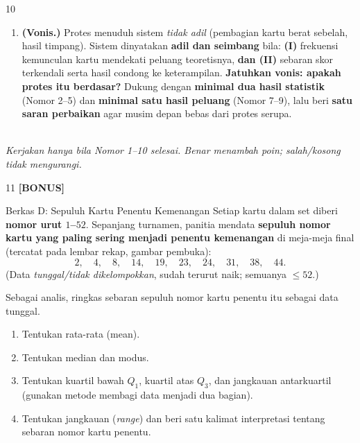 \documentclass[11pt]{article}
\newenvironment{subsoal}{%
  \begin{enumerate}[label=\textbf{(\alph*)},leftmargin=1.8em,itemsep=5pt,topsep=3pt]}%
  {\end{enumerate}}
\begin{document}
\begin{soal}{10}
\begin{subsoal}
        dikeluarkan, apakah korelasi waktu--skor \emph{menguat} atau \emph{melemah}?
        Mengapa?
  \item \textbf{(Vonis.)} Protes menuduh sistem \emph{tidak adil} (pembagian kartu
        berat sebelah, hasil timpang). Sistem dinyatakan \textbf{adil dan seimbang}
        bila: \textbf{(I)} frekuensi kemunculan kartu mendekati peluang teoretisnya,
        \textbf{dan (II)} sebaran skor terkendali serta hasil condong ke keterampilan.
        \textbf{Jatuhkan vonis: apakah protes itu berdasar?} Dukung dengan
        \textbf{minimal dua hasil statistik} (Nomor 2--5) dan \textbf{minimal satu
        hasil peluang} (Nomor 7--9), lalu beri \textbf{satu saran perbaikan} agar
        musim depan bebas dari protes serupa.
\end{subsoal}
\end{soal}

\clearpage
{}\\[0.2em]
\small\emph{Kerjakan hanya bila Nomor 1--10 selesai. Benar menambah poin;
salah/kosong tidak mengurangi.}\normalsize

\bigskip

\begin{soal}{11 \normalfont\bfseries[BONUS]}
\begin{berkas}{Berkas D: Sepuluh Kartu Penentu Kemenangan}
\centering\small
Setiap kartu dalam set diberi \textbf{nomor urut $1$--$52$}. Sepanjang turnamen,
panitia mendata \textbf{sepuluh nomor kartu yang paling sering menjadi penentu
kemenangan} di meja-meja final (tercatat pada lembar rekap, gambar pembuka):
\[
2,\quad 4,\quad 8,\quad 14,\quad 19,\quad 23,\quad 24,\quad 31,\quad 38,\quad 44.
\]
(Data \emph{tunggal/tidak dikelompokkan}, sudah terurut naik; semuanya $\le52$.)
\end{berkas}

\smallskip
Sebagai analis, ringkas sebaran sepuluh nomor kartu penentu itu sebagai data tunggal.
\begin{subsoal}
  \item Tentukan rata-rata (mean).
  \item Tentukan median dan modus.
  \item Tentukan kuartil bawah $Q_1$, kuartil atas $Q_3$, dan jangkauan
        antarkuartil (gunakan metode membagi data menjadi dua bagian).
  \item Tentukan jangkauan (\emph{range}) dan beri satu kalimat interpretasi
        tentang sebaran nomor kartu penentu.
\end{subsoal}
\end{soal}
\end{document}
